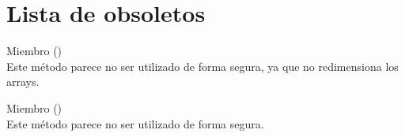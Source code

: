 \chapter{Lista de obsoletos }
\hypertarget{deprecated}{}\label{deprecated}

\begin{DoxyRefList}
\item[Miembro \doxylink{classtop_1_1_t_o_p_t_w_a89fe6a60b12960241afe3381b558853b}{top.TOPTW.add\+Node} ()]\hfill \\
\label{deprecated__deprecated000001}%
%
Este método parece no ser utilizado de forma segura, ya que no redimensiona los arrays.  
\item[Miembro \doxylink{classtop_1_1_t_o_p_t_w_abc8ba9eecbd30ef1941a21418259045f}{top.TOPTW.add\+Node\+Depot} ()]\hfill \\
\label{deprecated__deprecated000002}%
%
Este método parece no ser utilizado de forma segura. 
\end{DoxyRefList}